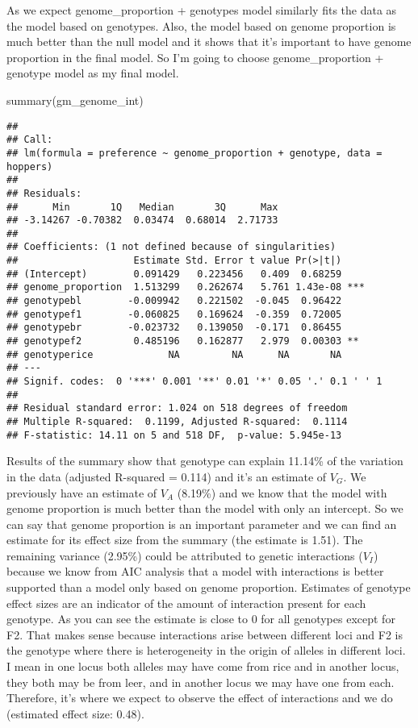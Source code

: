 \documentclass[
]{article}
\newenvironment{Shaded}{\begin{snugshade}}{\end{snugshade}}
\newcommand{\FunctionTok}[1]{\textcolor[rgb]{0.00,0.00,0.00}{#1}}
\newcommand{\NormalTok}[1]{#1}
\begin{document}
As we expect genome\_proportion + genotypes model similarly fits the
data as the model based on genotypes. Also, the model based on genome
proportion is much better than the null model and it shows that it's
important to have genome proportion in the final model. So I'm going to
choose genome\_proportion + genotype model as my final model.

\begin{Shaded}
\begin{Highlighting}[]
\FunctionTok{summary}\NormalTok{(gm\_genome\_int)}
\end{Highlighting}
\end{Shaded}

\begin{verbatim}
## 
## Call:
## lm(formula = preference ~ genome_proportion + genotype, data = hoppers)
## 
## Residuals:
##      Min       1Q   Median       3Q      Max 
## -3.14267 -0.70382  0.03474  0.68014  2.71733 
## 
## Coefficients: (1 not defined because of singularities)
##                    Estimate Std. Error t value Pr(>|t|)    
## (Intercept)        0.091429   0.223456   0.409  0.68259    
## genome_proportion  1.513299   0.262674   5.761 1.43e-08 ***
## genotypebl        -0.009942   0.221502  -0.045  0.96422    
## genotypef1        -0.060825   0.169624  -0.359  0.72005    
## genotypebr        -0.023732   0.139050  -0.171  0.86455    
## genotypef2         0.485196   0.162877   2.979  0.00303 ** 
## genotyperice             NA         NA      NA       NA    
## ---
## Signif. codes:  0 '***' 0.001 '**' 0.01 '*' 0.05 '.' 0.1 ' ' 1
## 
## Residual standard error: 1.024 on 518 degrees of freedom
## Multiple R-squared:  0.1199, Adjusted R-squared:  0.1114 
## F-statistic: 14.11 on 5 and 518 DF,  p-value: 5.945e-13
\end{verbatim}

Results of the summary show that genotype can explain 11.14\% of the
variation in the data (adjusted R-squared = 0.114) and it's an estimate
of \(V_G\). We previously have an estimate of \(V_A\) (8.19\%) and we
know that the model with genome proportion is much better than the model
with only an intercept. So we can say that genome proportion is an
important parameter and we can find an estimate for its effect size from
the summary (the estimate is 1.51). The remaining variance (2.95\%)
could be attributed to genetic interactions (\(V_I\)) because we know
from AIC analysis that a model with interactions is better supported
than a model only based on genome proportion. Estimates of genotype
effect sizes are an indicator of the amount of interaction present for
each genotype. As you can see the estimate is close to 0 for all
genotypes except for F2. That makes sense because interactions arise
between different loci and F2 is the genotype where there is
heterogeneity in the origin of alleles in different loci. I mean in one
locus both alleles may have come from rice and in another locus, they
both may be from leer, and in another locus we may have one from each.
Therefore, it's where we expect to observe the effect of interactions
and we do (estimated effect size: 0.48).
\end{document}
